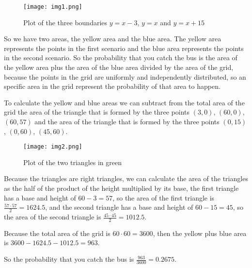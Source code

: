 \singlespacing

\break

\begin{figure}[h]
    \centering
    \texttt{[image: img1.png]}
    \caption{Plot of the three boundaries $y = x - 3$, $y = x$ and $y = x + 15$}
\end{figure}

\singlespacing
\singlespacing

So we have two areas, the yellow area and the blue area. The yellow area
represents the points in the first scenario and the blue area represents
the points in the second scenario. So the probability that you catch the
bus is the area of the yellow area plus the area of the blue area divided
by the area of the grid, because the points in the grid are uniformly and
independently distributed, so an specific area in the grid represent the
probability of that area to happen.

\singlespacing
\singlespacing

To calculate the yellow and blue areas we can subtract from the total
area of the grid the area of the triangle that is formed by the three
points $(3, 0)$, $(60, 0)$, $(60, 57)$ and the area of the triangle
that is formed by the three points $(0, 15)$, $(0, 60)$, $(45, 60)$.

\singlespacing
\singlespacing

\begin{figure}[h]
    \centering
    \texttt{[image: img2.png]}
    \caption{Plot of the two triangles in green}
\end{figure}

\break

Because the triangles are right triangles, we can calculate the area
of the triangles as the half of the product of the height multiplied by
its base, the first
triangle has a base and height of $60 - 3 = 57$,
so the area of the first triangle is $\frac{57 \cdot 57}{2} = 1624.5$,
and the second triangle has a base and height of $60 - 15 = 45$,
so the area of the second triangle is $\frac{45 \cdot 45}{2} = 1012.5$.

\singlespacing
\singlespacing

Because the total area of the grid is $60 \cdot 60 = 3600$, then the
yellow plus blue area is $3600 - 1624.5 - 1012.5 = 963$.

\singlespacing
\singlespacing
\singlespacing

So the probability that you catch the bus is $\frac{963}{3600} = 0.2675$.